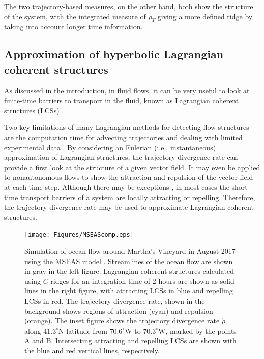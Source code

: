 \documentclass[twocolumn]{svjour3}
\begin{document}
The two trajectory-based measures, on the other hand, both show the structure of the system, with the integrated measure of $\rho_T$ giving a more defined ridge by taking into account longer time information.

\subsection{Approximation of hyperbolic Lagrangian coherent structures}\label{ss:LCSapprox}
As discussed in the introduction, in fluid flows, it can be very useful to look at finite-time barriers to transport in the fluid, known as Lagrangian coherent structures (LCSs) \cite{shadden2005definition}.

Two key limitations of many Lagrangian methods for detecting flow structures are the computation time for advecting trajectories \cite{brunton2010fast,ameli2014development} and dealing with limited experimental data \cite{garth2007efficient}. By considering an Eulerian (i.e., instantaneous) approximation of Lagrangian structures, the trajectory divergence rate can provide a first look at the structure of a given vector field. It may even be applied to nonautonomous flows to show the attraction and repulsion of the vector field at each time step. Although there may be exceptions \cite{tallapragada2017globally}, in most cases the short time transport barriers of a system are locally attracting or repelling. Therefore, the trajectory divergence rate may be used to approximate Lagrangian coherent structures. 

\begin{figure}
\centering
\texttt{[image: Figures/MSEAScomp.eps]}
\caption{Simulation of ocean flow around Martha's Vineyard in August 2017 using the MSEAS model \cite{de2014relocatable}. Streamlines of the ocean flow are shown in gray in the left figure. Lagrangian coherent structures calculated using $C$-ridges \cite{schindler2012ridge} for an integration time of 2 hours are shown as solid lines in the right figure, with attracting LCSs in blue and repelling LCSs in red. The trajectory divergence rate, shown in the background shows regions of attraction (cyan) and repulsion (orange). The inset figure shows the trajectory divergence rate $\dot{\rho}$ along $41.3^\circ$N latitude from $70.6^\circ$W to $70.3^\circ$W, marked by the points A and B. Intersecting attracting and repelling LCSs are shown with the blue and red vertical lines, respectively.}
\label{fig:LCScomp}
\end{figure}
\end{document}
